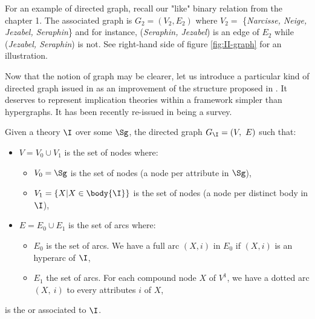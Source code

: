 For an example of directed graph, recall our "like" binary relation from the
chapter 1. The associated graph is $G_2 = (V_2, E_2)$ where $V_2 = $ 
\{\textit{Narcisse, Neige, Jezabel, Seraphin}\} and for instance, 
(\textit{Seraphin, Jezabel}) is an edge of $E_2$ while (\textit{Jezabel, 
Seraphin}) is not. See right-hand side of figure \ref{fig:II-graph} for an 
illustration.

Now that the notion of graph may be clearer, let us introduce a particular
kind of directed graph issued in \cite{ausiello_graph_1983, 
ausiello_minimal_1986} as an improvement of the structure proposed in 
\cite{ausiello_graph_1980}. It deserves to represent implication theories within
a framework simpler than hypergraphs. It has been recently re-issued in 
\cite{ausiello_directed_2017} being a survey.

\begin{definition} Given a theory $\I$ over some $\Sg$, 
the directed graph $G_{\I} = (V, \  E)$ such that:
\begin{itemize}
	\item $V = V_0 \cup V_1$ is the set of nodes where:
	\begin{itemize}
		\item $V_0 = \Sg$ is the set of  nodes (a node
		per attribute in $\Sg$),
		\item $V_1 = \{X | X \in \body{\I} \}$ is the set of 
		 nodes (a node per distinct body in $\I$),
	\end{itemize}
	
	\item $E = E_0 \cup E_1$ is the set of arcs where:
	\begin{itemize}
		\item $E_0$ is the set of  arcs. We have a full arc 
		$(X, i)$ in	$E_0$ if $(X, i)$ is an hyperarc of $\I$,
		\item $E_1$ the set of  arcs. For each compound node 
		$X$ of $V^1$, we have a dotted arc $(X, \ i)$ to every attributes 
		$i$ of $X$,
	\end{itemize}
	
\end{itemize}
\noindent is the  or  
associated to $\I$.
\end{definition}


